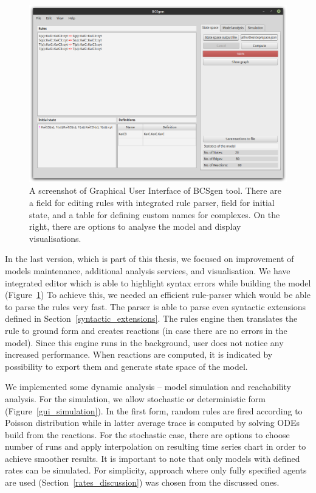 \documentclass[12pt]{fithesis2}
\begin{document}
\begin{figure}[!h]
\begin{center}
\includegraphics[scale=0.33]{pics/BCSgen_gui}
\caption{A screenshot of Graphical User Interface of BCSgen tool. There are a field for editing rules with integrated rule parser, field for initial state, and a table for defining custom names for complexes. On the right, there are options to analyse the model and display visualisations.}\label{gui_example}
\end{center}
\end{figure}

In the last version, which is part of this thesis, we focused on improvement of models maintenance, additional analysis services, and visualisation. We have integrated editor which is able to highlight syntax errors while building the model (Figure~\ref{gui_example}) To achieve this, we needed an efficient rule-parser which would be able to parse the rules very fast. The parser is able to parse even syntactic extensions defined in Section~\ref{syntactic_extensions}. The rules engine then translates the rule to ground form and creates reactions (in case there are no errors in the model). Since this engine runs in the background, user does not notice any increased performance. When reactions are computed, it is indicated by possibility to export them and generate state space of the model.

We implemented some dynamic analysis -- model simulation and reachability analysis. For the simulation, we allow stochastic or deterministic form (Figure~\ref{gui_simulation}). In the first form, random rules are fired according to Poisson distribution while in latter average trace is computed by solving ODEs build from the reactions. For the stochastic case, there are options to choose number of runs and apply interpolation on resulting time series chart in order to achieve smoother results. It is important to note that only models with defined rates can be simulated. For simplicity, approach where only fully specified agents are used (Section~\ref{rates_discussion}) was chosen from the discussed ones.
\end{document}
